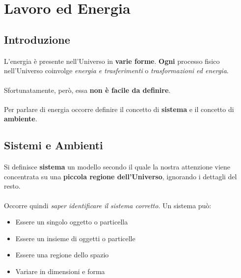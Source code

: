 \documentclass[12pt]{article}
\begin{document}
    \section{Lavoro ed Energia}
    \subsection{Introduzione}
    \paragraph{} L'energia è presente nell'Universo in \textbf{varie forme}. \textbf{Ogni} processo fisico nell'Universo coinvolge \textit{energia e trasferimenti} o \textit{trasformazioni ed energia}.
    \paragraph{} Sfortunatamente, però, essa \textbf{non è facile da definire}.
    \paragraph{} Per parlare di energia occorre definire il concetto di \textbf{sistema} e il concetto di \textbf{ambiente}.

    \subsection{Sistemi e Ambienti}

    \paragraph{} Si definisce \textbf{sistema} un modello secondo il quale la nostra attenzione viene concentrata su una \textbf{piccola regione dell'Universo}, ignorando i dettagli del resto.
    \paragraph{} Occorre quindi \textit{saper identificare il sistema corretto}. Un sistema può:
    \begin{itemize}
        \item Essere un singolo oggetto o particella
        \item Essere un insieme di oggetti o particelle
        \item Essere una regione dello spazio
        \item Variare in dimensioni e forma
    \end{itemize}
\end{document}
